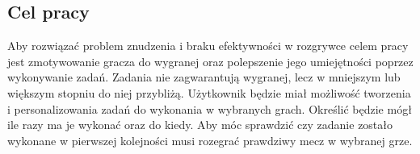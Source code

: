 	\subsection*{Cel pracy}
		Aby rozwiązać problem znudzenia i braku efektywności w rozgrywce celem pracy jest zmotywowanie gracza do wygranej oraz polepszenie jego umiejętności poprzez wykonywanie zadań. Zadania nie zagwarantują wygranej, lecz w mniejszym lub większym stopniu do niej przybliżą. Użytkownik będzie miał możliwość tworzenia i personalizowania zadań do wykonania w wybranych grach. Określić będzie mógł ile razy ma je wykonać oraz do kiedy. Aby móc sprawdzić czy zadanie zostało wykonane w pierwszej kolejności musi rozegrać prawdziwy mecz w wybranej grze.\par
	
	
	
